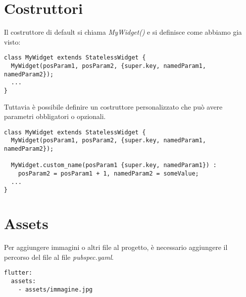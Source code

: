 \documentclass[12pt]{article}
\begin{document}
\section{Costruttori}
Il costruttore di default si chiama \textit{MyWidget()}
e si definisce come abbiamo gia visto: 
\begin{highlight}
\begin{verbatim}
class MyWidget extends StatelessWidget {
  MyWidget(posParam1, posParam2, {super.key, namedParam1, namedParam2});
  ...
}
\end{verbatim}
\end{highlight}

Tuttavia è possibile definire un costruttore personalizzato
che può avere parametri obbligatori o opzionali.

\begin{highlight}
\begin{verbatim}
class MyWidget extends StatelessWidget {
  MyWidget(posParam1, posParam2, {super.key, namedParam1, namedParam2});

  MyWidget.custom_name(posParam1 {super.key, namedParam1}) : 
    posParam2 = posParam1 + 1, namedParam2 = someValue;
  ...
}
\end{verbatim}
\end{highlight}

\section{Assets}
Per aggiungere immagini o altri file al progetto, è necessario
aggiungere il percorso del file al file \textit{pubspec.yaml}.
\begin{highlight}
\begin{verbatim}
flutter:
  assets:
    - assets/immagine.jpg
\end{verbatim}
\end{highlight}
\end{document}
